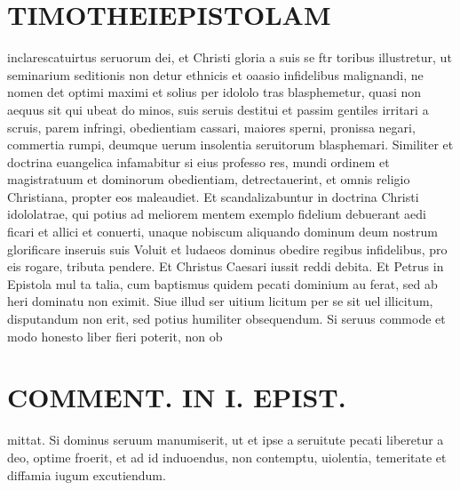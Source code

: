\documentclass{article}
\begin{document}
\begin{pages}
\section*{TIMOTHEIEPISTOLAM }
\marginpar{[ p.153 ]}\pstart inclarescatuirtus seruorum dei, et Christi gloria a suis se ftr toribus illustretur, ut seminarium seditionis non detur ethnicis et oaasio infidelibus malignandi, ne nomen det optimi maximi et solius per idololo tras blasphemetur, quasi non aequus sit qui ubeat do minos, suis seruis destitui et passim gentiles irritari a scruis, parem infringi, obedientiam cassari, maiores sperni, pronissa negari, commertia rumpi, deumque  uerum insolentia seruitorum blasphemari. Similiter et doctrina euangelica infamabitur si eius professo res, mundi ordinem et magistratuum et dominorum obedientiam, detrectauerint, et omnis religio Christiana, propter eos maleaudiet. Et scandalizabuntur in doctrina Christi idololatrae, qui potius ad meliorem mentem exemplo fidelium debuerant aedi ficari et allici et conuerti, unaque nobiscum aliquando dominum deum nostrum glorificare inseruis suis Voluit et ludaeos dominus obedire regibus infidelibus, pro eis rogare, tributa pendere. Et Christus Caesari iussit reddi debita. Et Petrus in Epistola mul ta talia, cum baptismus quidem pecati dominium au ferat, sed ab heri dominatu non eximit. Siue illud ser uitium licitum per se sit uel illicitum, disputandum non erit, sed potius humiliter obsequendum. Si seruus commode et modo honesto liber fieri poterit, non ob  \pend
\section*{COMMENT. IN I. EPIST. }
\marginpar{[ p.154 ]}\pstart mittat. Si dominus seruum manumiserit, ut et ipse a seruitute pecati liberetur a deo, optime froerit, et ad id induoendus, non contemptu, uiolentia, temeritate et diffamia iugum excutiendum.  \pend
{}
{}

\end{pages}
\end{document}
